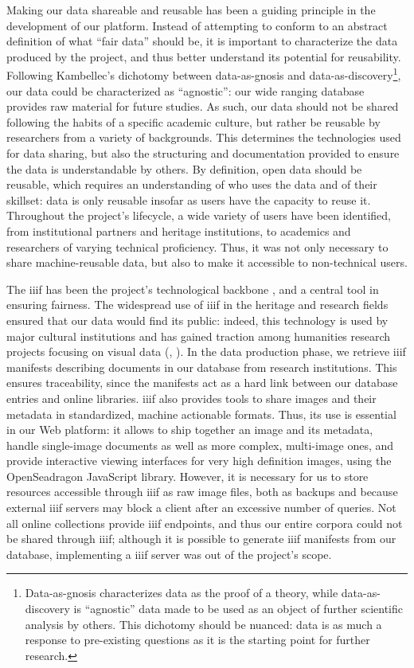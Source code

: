 \documentclass[12pt, a4paper, twocolumn]{article}
\begin{document}
Making our data shareable and reusable has been a guiding principle in the development of our platform. Instead of attempting to conform to an abstract definition of what ``\acs{fair} data'' should be, it is important to characterize the data produced by the project, and thus better understand its potential for reusability. Following Kambellec's \parencite[5]{kembellec:hal-02306958} dichotomy between data-as-gnosis and data-as-discovery\footnote{
    Data-as-gnosis characterizes data as the proof of a theory, while data-as-discovery is ``agnostic'' data made to be used as an object of further scientific analysis by others. This dichotomy should be nuanced: data is as much a response to pre-existing questions as it is the starting point for further research.
}, our data could be characterized as ``agnostic'': our wide ranging database provides raw material for future studies. As such, our data should not be shared following the habits of a specific academic culture, but rather be reusable by researchers from a variety of backgrounds. This determines the technologies used for data sharing, but also the structuring and documentation provided to ensure the data is understandable by others. By definition, open data should be reusable, which requires an understanding of who uses the data and of their skillset: data is only reusable insofar as users have the capacity to reuse it. Throughout the project's lifecycle, a wide variety of users have been identified, from institutional partners and heritage institutions, to academics and researchers of varying technical proficiency. Thus, it was not only necessary to share machine-reusable data, but also to make it accessible to non-technical users.

The \acl{iiif} has been the project's technological backbone , and a central tool in ensuring \acs{fair}ness. The widespread use of \acs{iiif} in the heritage and research fields ensured that our data would find its public: indeed, this technology is used by major cultural institutions \parencite{moreux:hal-04675821} and has gained traction among humanities research projects focusing on visual data (\cite{albouy2024aikon}, \cite{hart:hal-04615362}). In the data production phase, we retrieve \acs{iiif} manifests describing documents in our database from research institutions. This ensures traceability, since the manifests act as a hard link between our database entries and online libraries. \acs{iiif} also provides tools to share images and their metadata in standardized, machine actionable formats. Thus, its use is essential in our Web platform: it allows to ship together an image and its metadata, handle single-image documents as well as more complex, multi-image ones, and provide interactive viewing interfaces for very high definition images, using the OpenSeadragon JavaScript library. However, it is necessary for us to store resources accessible through \acs{iiif} as raw image files, both as backups and because external \acs{iiif} servers may block a client after an excessive number of queries. Not all online collections provide \acs{iiif} endpoints, and thus our entire corpora could not be shared through \acs{iiif}; although it is possible to generate \acs{iiif} manifests from our database, implementing a \acs{iiif} server was out of the project's scope.
\end{document}
